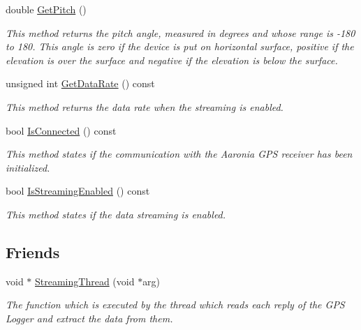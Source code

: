 \begin{DoxyCompactItemize}
\mbox{\label{classGPSInterface_afbea020a31dde632a8e7c6f1595eedf6}} 
double \hyperlink{classGPSInterface_afbea020a31dde632a8e7c6f1595eedf6}{Get\+Pitch} ()
\begin{DoxyCompactList}\small\item\em This method returns the pitch angle, measured in degrees and whose range is -\/180 to 180. This angle is zero if the device is put on horizontal surface, positive if the elevation is over the surface and negative if the elevation is below the surface. \end{DoxyCompactList}\item 
\mbox{\label{classGPSInterface_a460c65aca30831d73e2cad9c57856fd7}} 
unsigned int \hyperlink{classGPSInterface_a460c65aca30831d73e2cad9c57856fd7}{Get\+Data\+Rate} () const
\begin{DoxyCompactList}\small\item\em This method returns the data rate when the streaming is enabled. \end{DoxyCompactList}\item 
\mbox{\label{classGPSInterface_a568715247cbcfa261d68a030df7bd1ef}} 
bool \hyperlink{classGPSInterface_a568715247cbcfa261d68a030df7bd1ef}{Is\+Connected} () const
\begin{DoxyCompactList}\small\item\em This method states if the communication with the Aaronia G\+PS receiver has been initialized. \end{DoxyCompactList}\item 
\mbox{\label{classGPSInterface_a2c67fa6d56d0c422f92f29f5970fa57b}} 
bool \hyperlink{classGPSInterface_a2c67fa6d56d0c422f92f29f5970fa57b}{Is\+Streaming\+Enabled} () const
\begin{DoxyCompactList}\small\item\em This method states if the data streaming is enabled. \end{DoxyCompactList}\end{DoxyCompactItemize}
\subsection*{Friends}
\begin{DoxyCompactItemize}
\item 
\mbox{\label{classGPSInterface_a95d1d8f71a2e0f4de76627a6a2cab84a}} 
void $\ast$ \hyperlink{classGPSInterface_a95d1d8f71a2e0f4de76627a6a2cab84a}{Streaming\+Thread} (void $\ast$arg)
\begin{DoxyCompactList}\small\item\em The function which is executed by the thread which reads each reply of the G\+PS Logger and extract the data from them. \end{DoxyCompactList}\end{DoxyCompactItemize}


